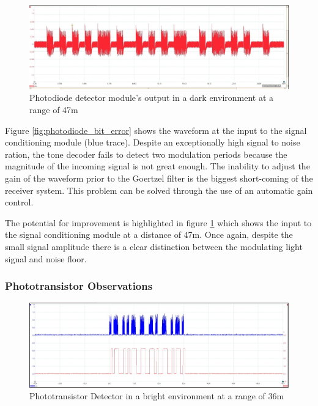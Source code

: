 \begin{figure}[H]
	\centering
	\includegraphics[width=.9\textwidth]{figures/results/drak_system_test/photodiode4770cm.jpg}
	\caption{Photodiode detector module's output in a dark environment at a range of 47m}
	\label{fig:photodiode_range_4770cm}
\end{figure}

Figure \ref{fig:photodiode_bit_error} shows the waveform at the input to the signal conditioning module (blue trace). Despite an exceptionally high signal to noise ration, the tone decoder fails to detect two modulation periods because the magnitude of the incoming signal is not great enough. The inability to adjust the gain of the waveform prior to the Goertzel filter is the biggest short-coming of the receiver system.  This problem can be solved through the use of an automatic gain control.

The potential for improvement is highlighted in figure \ref{fig:photodiode_range_4770cm} which shows the input to the signal conditioning module at a distance of 47m. Once again, despite the small signal amplitude there is a clear distinction between the modulating light signal and noise floor.


\subsubsection{Phototransistor Observations}

\begin{figure}[H]
	\centering
	\includegraphics[width=.9\textwidth]{figures/results/system_test/36m_phototranaistoroutput.JPG}
	\caption{Phototransistor Detector in a bright environment at a range of 36m}
	\label{fig:phototransistor1}
\end{figure}

